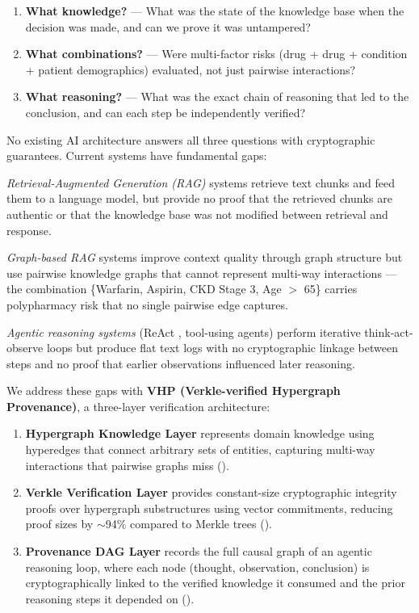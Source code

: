 \documentclass[11pt,a4paper]{article}
\begin{document}
\begin{enumerate}[noitemsep]
    \item \textbf{What knowledge?} --- What was the state of the knowledge base when the decision was made, and can we prove it was untampered?
    \item \textbf{What combinations?} --- Were multi-factor risks (drug + drug + condition + patient demographics) evaluated, not just pairwise interactions?
    \item \textbf{What reasoning?} --- What was the exact chain of reasoning that led to the conclusion, and can each step be independently verified?
\end{enumerate}

No existing AI architecture answers all three questions with cryptographic guarantees. Current systems have fundamental gaps:

\textit{Retrieval-Augmented Generation (RAG)} systems \citep{lewis2020rag} retrieve text chunks and feed them to a language model, but provide no proof that the retrieved chunks are authentic or that the knowledge base was not modified between retrieval and response.

\textit{Graph-based RAG} systems \citep{edge2024graphrag, he2024gretriever} improve context quality through graph structure but use pairwise knowledge graphs that cannot represent multi-way interactions --- the combination \{Warfarin, Aspirin, CKD Stage 3, Age $>$ 65\} carries polypharmacy risk that no single pairwise edge captures.

\textit{Agentic reasoning systems} (ReAct \citep{yao2023react}, tool-using agents) perform iterative think-act-observe loops but produce flat text logs with no cryptographic linkage between steps and no proof that earlier observations influenced later reasoning.

We address these gaps with \textbf{VHP (Verkle-verified Hypergraph Provenance)}, a three-layer verification architecture:

\begin{enumerate}[noitemsep]
    \item \textbf{Hypergraph Knowledge Layer} represents domain knowledge using hyperedges that connect arbitrary sets of entities, capturing multi-way interactions that pairwise graphs miss ().
    
    \item \textbf{Verkle Verification Layer} provides constant-size cryptographic integrity proofs over hypergraph substructures using vector commitments, reducing proof sizes by $\sim$94\% compared to Merkle trees ().
    
    \item \textbf{Provenance DAG Layer} records the full causal graph of an agentic reasoning loop, where each node (thought, observation, conclusion) is cryptographically linked to the verified knowledge it consumed and the prior reasoning steps it depended on ().
\end{enumerate}
\end{document}
